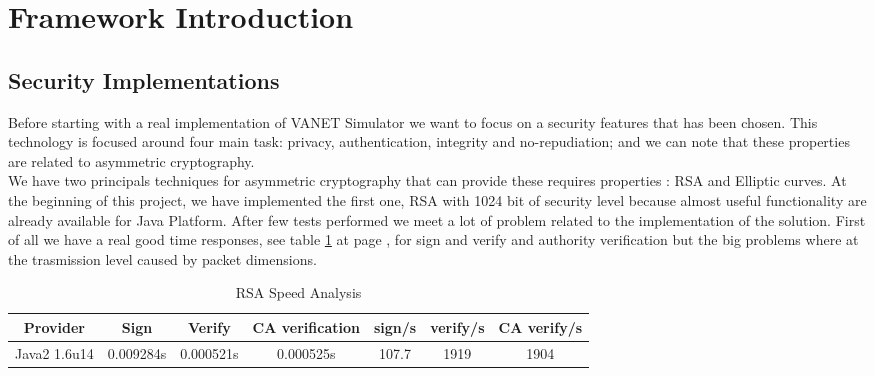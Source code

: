 \section{Framework Introduction}
\subsection{Security Implementations}\label{sec:CryptographyOverhead}
Before starting with  a real implementation of VANET Simulator we want to focus on a security features that has been chosen. This technology is focused around four main task: privacy, authentication, integrity and no-repudiation; and we can note that these properties are related to asymmetric cryptography.\\ 
We have two  principals techniques for asymmetric cryptography that can provide these requires properties : RSA and Elliptic curves. At the beginning of this project, we have implemented the first one, RSA with 1024 bit of security level because almost useful functionality are already available for Java Platform. After few tests performed we meet a lot of problem related to the implementation of the solution. First of all we have a real good time responses, see table \ref{tab:RSAVelocity} at page \pageref{tab:RSAVelocity}, for sign and verify and authority verification but the big problems where at the trasmission level caused by packet dimensions.
\begin{table}[!ht]
	\centering
	\caption{RSA Speed Analysis}
	\begin{tabular}{|c|c|c|c|c|c|c|}
	\hline\hline 
	\textbf{Provider} & \textbf{Sign} & \textbf{Verify} & \textbf{CA verification} & \textbf{sign/s} & \textbf{verify/s}  & \textbf{CA verify/s}\\
	\hline
	Java2 1.6u14 & 0.009284s & 0.000521s & 0.000525s & 107.7 & 1919 & 1904 \\
	\hline
	\hline     %
 	\end{tabular} 
	\label{tab:RSAVelocity}
\end{table}
